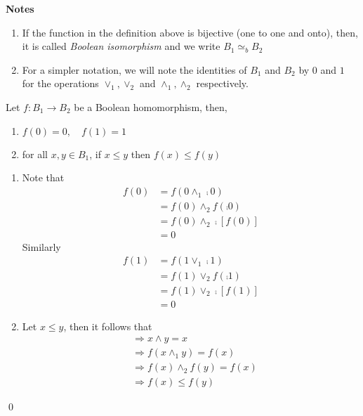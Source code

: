 \noindent
\textbf{Notes}
\begin{enumerate}
  \item If the function in the definition above is bijective (one to one and onto), then, it is called \textit{Boolean isomorphism} and we write \(B_1\simeq_b B_2\)

  \item For a simpler notation, we will note the identities of \(B_1\) and \(B_2\) by \(0\) and \(1\) for the operations \(\vee_1,\vee_2\) and \(\wedge_1,\wedge_2\) respectively.
\end{enumerate}

\begin{theo}
    Let \(f:B_1\longrightarrow B_2\) be a Boolean homomorphism, then,
    \begin{enumerate}
        \item[\normalfont{1.}] \(f(0)=0,\quad f(1)=1\)

        \item[\normalfont{2.}] for all \(x,y\in B_1\), if \(x\leq y\) then \(f(x)\leq f(y)\)
    \end{enumerate}
\end{theo}

\begin{myproof}
\noindent
    \begin{enumerate}
        \item Note that
        \begin{align*}
            f(0)&=f(0\wedge_1\comp{0})\\
            &=f(0)\wedge_2 f(\comp{0})\\
            &=f(0)\wedge_2\comp{[f(0)]}\\
            &=0
        \end{align*}
        Similarly
        \begin{align*}
            f(1)&=f(1\vee_1\comp{1})\\
            &=f(1)\vee_2 f(\comp{1})\\
            &=f(1)\vee_2\comp{[f(1)]}\\
            &=0
        \end{align*}

        \item Let \(x\leq y\), then it follows that
        \begin{align*}
            &\Longrightarrow x\wedge y=x\\
            &\Longrightarrow f(x\wedge_1 y)=f(x)\\
            &\Longrightarrow f(x)\wedge_2 f(y)=f(x)\\
            &\Longrightarrow f(x)\leq f(y)
        \end{align*}
    \end{enumerate}\qed
\end{myproof}
